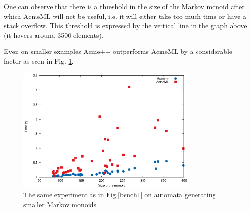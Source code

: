 One can observe that there is a threshold in the size of the Markov
monoid after which AcmeML will not be useful, i.e. it will either take
too much time or have a stack overflow. This threshold is expressed by
the vertical line in the graph above (it hovers around 3500 elements).

Even on smaller examples Acme++ outperforms AcmeML by a considerable
factor as seen in Fig. \ref{bench1zoomed}.

\begin{figure}[h!]
  \label{bench1zoomed}
  \begin{center}
    \includegraphics[width=0.8\textwidth]{graph/zoomlines}
    \caption{The same experiment as in Fig.\ref{bench1} on automata
      generating smaller Markov monoids}
  \end{center}  
\end{figure}
